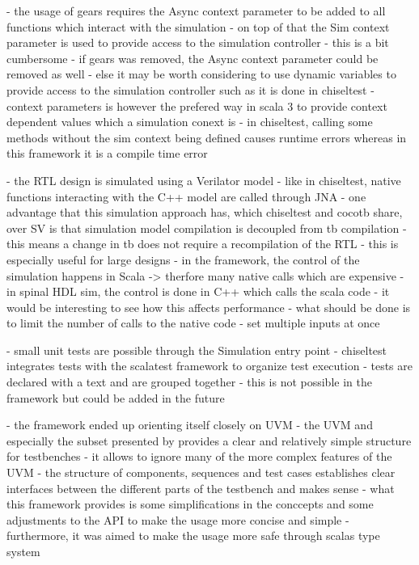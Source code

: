 - the usage of gears requires the Async context parameter to be added to all functions which interact with the simulation
- on top of that the Sim context parameter is used to provide access to the simulation controller
- this is a bit cumbersome
- if gears was removed, the Async context parameter could be removed as well
- else it may be worth considering to use dynamic variables to provide access to the simulation controller such as it is done in chiseltest
- context parameters is however the prefered way in scala 3 to provide context dependent values which a simulation conext is
- in chiseltest, calling some methods without the sim context being defined causes runtime errors whereas in this framework it is a compile time error

- the RTL design is simulated using a Verilator model
- like in chiseltest, native functions interacting with the C++ model are called through JNA
- one advantage that this simulation approach has, which chiseltest and cocotb share, over SV is that simulation model compilation is decoupled from tb compilation
- this means a change in tb does not require a recompilation of the RTL
- this is especially useful for large designs
- in the framework, the control of the simulation happens in Scala -> therfore many native calls which are expensive
- in spinal HDL sim, the control is done in C++ which calls the scala code
- it would be interesting to see how this affects performance
- what should be done is to limit the number of calls to the native code
  - set multiple inputs at once

- small unit tests are possible through the Simulation entry point
- chiseltest integrates tests with the scalatest framework to organize test execution
- tests are declared with a text and are grouped together
- this is not possible in the framework but could be added in the future

- the framework ended up orienting itself closely on UVM
- the UVM and especially the subset presented by \citeauthor{sutherland2015uvm} provides a clear and relatively simple structure for testbenches
- it allows to ignore many of the more complex features of the UVM
- the structure of components, sequences and test cases establishes clear interfaces between the different parts of the testbench and makes sense
- what this framework provides is some simplifications in the conccepts and some adjustments to the API to make the usage more concise and simple
- furthermore, it was aimed to make the usage more safe through scalas type system


